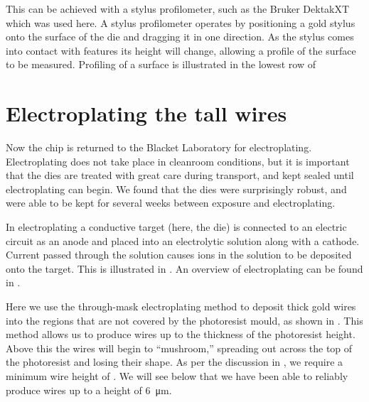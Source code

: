 This can be achieved with a stylus profilometer, such as the Bruker DektakXT
which was used here. A stylus profilometer operates by positioning a gold
stylus onto the surface of the die and dragging it in one direction. As
the stylus comes into contact with features its height will change, allowing a
profile of the surface to be measured. Profiling of a surface is illustrated
in the lowest row of 




%
%
%


\section{Electroplating the tall wires}

Now the chip is returned to the Blacket Laboratory for electroplating.
Electroplating does not take place in cleanroom conditions, but it is important
that the dies are treated with great care during transport, and kept sealed
until electroplating can begin. We found that the dies were surprisingly
robust, and were able to be kept for several weeks between exposure and
electroplating.

In electroplating a conductive target (here, the die) is connected to an
electric circuit as an anode and placed into an electrolytic solution along
with a cathode. Current passed through the solution causes ions in the solution
to be deposited onto the target. This is illustrated in
. An overview of electroplating can be found in
.
%

Here we use the through-mask electroplating method to deposit thick gold wires
into the regions that are not covered by the photoresist mould, as shown in
. This method allows us to produce wires up to the
thickness of the photoresist height. Above this the wires will begin to
``mushroom,'' spreading out across the top of the photoresist and losing their
shape. As per the discussion in , we require a minimum wire
height of . We will see below that we have been able
to reliably produce wires up to a height of \SI{6}{\micro\meter}.

